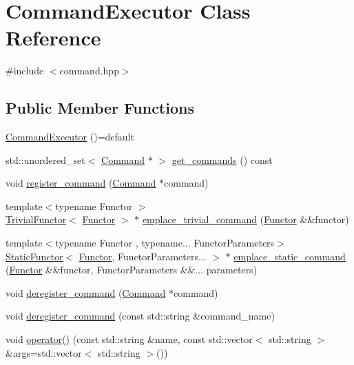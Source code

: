 \hypertarget{class_command_executor}{}\section{Command\+Executor Class Reference}
\label{class_command_executor}


{\ttfamily \#include $<$command.\+hpp$>$}

\subsection*{Public Member Functions}
\begin{DoxyCompactItemize}
\item 
\mbox{\hyperlink{class_command_executor_aad0efdb2a1882ae006083e69de948dee}{Command\+Executor}} ()=default
\item 
std\+::unordered\+\_\+set$<$ \mbox{\hyperlink{class_command}{Command}} $\ast$ $>$ \mbox{\hyperlink{class_command_executor_a60a3ab2b3f7fde5c64bd213461061126}{get\+\_\+commands}} () const
\item 
void \mbox{\hyperlink{class_command_executor_a37052aaf61623b511be1f75cbecab8b7}{register\+\_\+command}} (\mbox{\hyperlink{class_command}{Command}} $\ast$command)
\item 
{\footnotesize template$<$typename Functor $>$ }\\\mbox{\hyperlink{class_trivial_functor}{Trivial\+Functor}}$<$ \mbox{\hyperlink{class_functor}{Functor}} $>$ $\ast$ \mbox{\hyperlink{class_command_executor_a988168a9e22cc38d309dd4c7c79921c1}{emplace\+\_\+trivial\+\_\+command}} (\mbox{\hyperlink{class_functor}{Functor}} \&\&functor)
\item 
{\footnotesize template$<$typename Functor , typename... Functor\+Parameters$>$ }\\\mbox{\hyperlink{class_static_functor}{Static\+Functor}}$<$ \mbox{\hyperlink{class_functor}{Functor}}, Functor\+Parameters... $>$ $\ast$ \mbox{\hyperlink{class_command_executor_a745e9fc9e15db7102e50b3b23370fc3d}{emplace\+\_\+static\+\_\+command}} (\mbox{\hyperlink{class_functor}{Functor}} \&\&functor, Functor\+Parameters \&\&... parameters)
\item 
void \mbox{\hyperlink{class_command_executor_a6f99990af551c26ced617d0c58720c74}{deregister\+\_\+command}} (\mbox{\hyperlink{class_command}{Command}} $\ast$command)
\item 
void \mbox{\hyperlink{class_command_executor_ae4af9df5bdf49a97f3efaf483f53c97b}{deregister\+\_\+command}} (const std\+::string \&command\+\_\+name)
\item 
void \mbox{\hyperlink{class_command_executor_a1076730c7e82e790ed11566677883b5e}{operator()}} (const std\+::string \&name, const std\+::vector$<$ std\+::string $>$ \&args=std\+::vector$<$ std\+::string $>$())
\end{DoxyCompactItemize}


